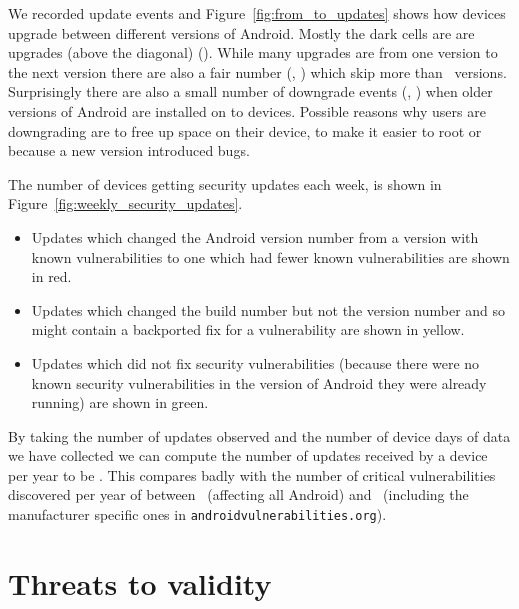 \documentclass[conference,a4paper,twoside]{IEEEtran}
\newcommand{\avo}{\texttt{androidvulnerabilities.org}}
\begin{document}
We recorded update events and Figure~\ref{fig:from_to_updates} shows how devices upgrade between different versions of Android.
Mostly the dark cells are are upgrades (above the diagonal) (\daNumUpdatesUpgrades).
While many upgrades are from one version to the next version there are also a fair number (\daNumUpdatesBigUpgrades, \daPercBigUpgrades) which skip more than \daNumUpdatesSkippedBig\ versions.
Surprisingly there are also a small number of downgrade events (\daNumUpdatesDowngrades, \daPercUpdatesDowngrades) when older versions of Android are installed on to devices.
Possible reasons why users are downgrading are to free up space on their device, to make it easier to root or because a new version introduced bugs.

The number of devices getting security updates each week, is shown in Figure~\ref{fig:weekly_security_updates}.
\begin{itemize}
 \item Updates which changed the Android version number from a version with known vulnerabilities to one which had fewer known vulnerabilities are shown in red.
 \item Updates which changed the build number but not the version number and so might contain a backported fix for a vulnerability are shown in yellow.
\item Updates which did not fix security vulnerabilities (because there were no known security vulnerabilities in the version of Android they were already running) are shown in green.

\end{itemize}

By taking the number of updates observed and the number of device days of data we have collected we can compute the number of updates received by a device per year to be \daUpdatesPerYear.
This compares badly with the number of critical vulnerabilities discovered per year of between \avoVulnsPerYearAllAndroid\ (affecting all Android) and \avoVulnsPerYear\ (including the manufacturer specific ones in \avo).





\section{Threats to validity}
\end{document}
